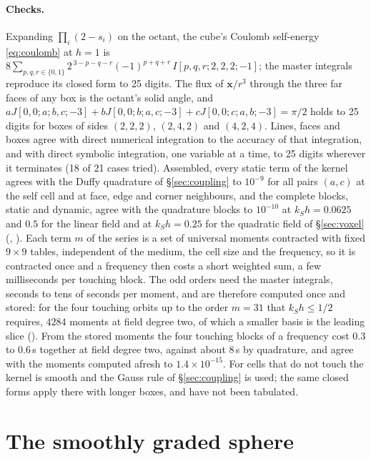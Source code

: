 \documentclass[11pt,a4paper]{article}
\begin{document}
\paragraph{Checks.} Expanding $\prod_i(2-s_i)$ on the octant, the cube's Coulomb self-energy
\eqref{eq:coulomb} at $h=1$ is
$8\sum_{p,q,r\in\{0,1\}}2^{\,3-p-q-r}(-1)^{p+q+r}\,I[p,q,r;2,2,2;-1]$; the master integrals reproduce its
closed form to 25 digits. The flux of
$\mathbf{x}/r^3$ through the three far faces of any box is the octant's solid angle, and
$aJ[0,0;a;b,c;-3]+bJ[0,0;b;a,c;-3]+cJ[0,0;c;a,b;-3]=\pi/2$ holds to 25 digits for boxes of sides
$(2,2,2)$, $(2,4,2)$ and $(4,2,4)$. Lines, faces and boxes agree with direct numerical integration to
the accuracy of that integration, and with direct symbolic integration, one variable at a time, to 25
digits wherever it terminates (18 of 21 cases tried). Assembled, every static term of the kernel agrees
with the Duffy quadrature of \S\ref{sec:coupling} to $10^{-9}$ for all pairs $(a,c)$ at the self cell and
at face, edge and corner neighbours, and the complete blocks, static and dynamic, agree with the
quadrature blocks to $10^{-10}$ at $k_Sh=0.0625$ and $0.5$ for the linear field and at $k_Sh=0.25$ for the
quadratic field of \S\ref{sec:voxel} (,
). Each term $m$ of the series is a set of universal moments contracted with fixed
$9\times9$ tables, independent of the medium, the cell size and the frequency, so it is contracted once and a
frequency then costs a short weighted sum, a few milliseconds per touching block. The odd orders need the master
integrals, seconds to tens of seconds per moment, and are therefore computed once and stored: for the four
touching orbits up to the order $m=31$ that $k_Sh\le1/2$ requires, $4284$ moments at field degree two, of which a
smaller basis is the leading slice (). From the stored moments the four
touching blocks of a frequency cost $0.3$ to $0.6$\,s together at field degree two, against about $8$\,s by
quadrature, and agree with the moments computed afresh to $1.4\times10^{-15}$. For cells that do not touch the kernel is smooth and the Gauss rule of
\S\ref{sec:coupling} is used; the same closed forms apply there with longer boxes, and have not been
tabulated.

\section{The smoothly graded sphere}\label{sec:sphere}
\end{document}

